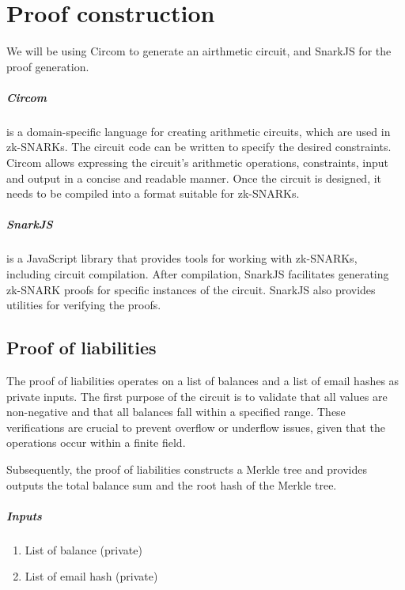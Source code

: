 
\chapter{Proof construction}
We will be using Circom to generate an airthmetic circuit, and SnarkJS for the proof generation.

\paragraph{Circom} is a domain-specific language for creating arithmetic circuits, which are used in zk-SNARKs.
The circuit code can be written to specify the desired constraints.
Circom allows expressing the circuit's arithmetic operations, constraints, input and output in a concise and readable manner.
Once the circuit is designed, it needs to be compiled into a format suitable for zk-SNARKs.


\paragraph{SnarkJS} is a JavaScript library that provides tools for working with zk-SNARKs, including circuit compilation.
After compilation, SnarkJS facilitates generating zk-SNARK proofs for specific instances of the circuit.
SnarkJS also provides utilities for verifying the proofs.

\section{Proof of liabilities}
The proof of liabilities operates on a list of balances and a list of email hashes as private inputs.
The first purpose of the circuit is to validate that all values are non-negative and that all balances fall within a specified range. 
These verifications are crucial to prevent overflow or underflow issues, given that the operations occur within a finite field. 

Subsequently, the proof of liabilities constructs a Merkle tree and provides outputs the total balance sum and the root hash of the Merkle tree.

\paragraph{Inputs}
\begin{enumerate}

    \item List of balance (private)
    
    \item List of email hash (private)
    
    \end{enumerate}

